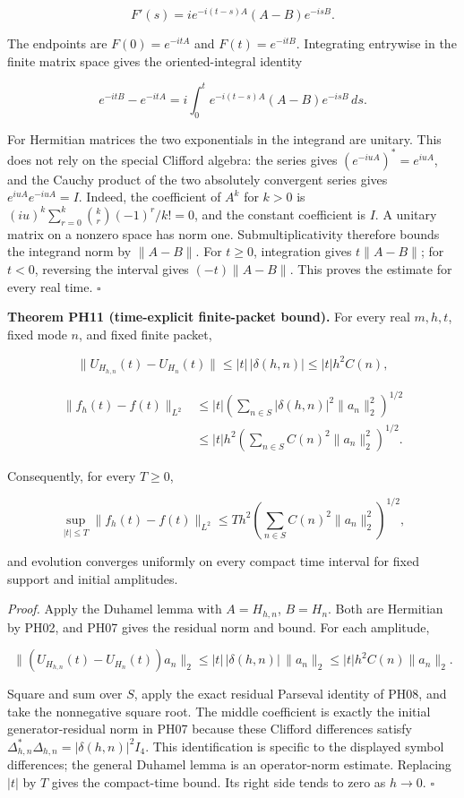 \[
F'(s)=i e^{-i(t-s)A}(A-B)e^{-isB}.
\]

The endpoints are \(F(0)=e^{-itA}\) and \(F(t)=e^{-itB}\). Integrating
entrywise in the finite matrix space gives the oriented-integral
identity

\[
e^{-itB}-e^{-itA}
=i\int_0^t e^{-i(t-s)A}(A-B)e^{-isB}\,ds.
\]

For Hermitian matrices the two exponentials in the integrand are
unitary. This does not rely on the special Clifford algebra: the series
gives \((e^{-iuA})^*=e^{iuA}\), and the Cauchy product of the two
absolutely convergent series gives \(e^{iuA}e^{-iuA}=I\). Indeed, the
coefficient of \(A^k\) for \(k>0\) is
\((iu)^k\sum_{r=0}^{k}\binom{k}{r}(-1)^r/k!=0\), and the constant
coefficient is \(I\). A unitary matrix on a nonzero space has norm one.
Submultiplicativity therefore bounds the integrand norm by \(\|A-B\|\).
For \(t\ge0\), integration gives \(t\|A-B\|\); for \(t<0\), reversing
the interval gives \((-t)\|A-B\|\). This proves the estimate for every
real time. \(\square\)

\textbf{Theorem PH11 (time-explicit finite-packet bound).} For every
real \(m,h,t\), fixed mode \(n\), and fixed finite packet,

\[
\|U_{H_{h,n}}(t)-U_{H_n}(t)\|
\le |t|\,|\delta(h,n)|\le |t|h^2C(n),
\]

\[
\begin{aligned}
\|f_h(t)-f(t)\|_{L^2}
&\le |t|\left(\sum_{n\in S}|\delta(h,n)|^2\|a_n\|_2^2\right)^{1/2}\\
&\le |t|h^2\left(\sum_{n\in S}C(n)^2\|a_n\|_2^2\right)^{1/2}.
\end{aligned}
\]

Consequently, for every \(T\ge0\),

\[
\sup_{|t|\le T}\|f_h(t)-f(t)\|_{L^2}
\le Th^2\left(\sum_{n\in S}C(n)^2\|a_n\|_2^2\right)^{1/2},
\]

and evolution converges uniformly on every compact time interval for
fixed support and initial amplitudes.

\emph{Proof.} Apply the Duhamel lemma with \(A=H_{h,n}\), \(B=H_n\).
Both are Hermitian by PH02, and PH07 gives the residual norm and bound.
For each amplitude,

\[
\|(U_{H_{h,n}}(t)-U_{H_n}(t))a_n\|_2
\le |t|\,|\delta(h,n)|\,\|a_n\|_2
\le |t|h^2C(n)\|a_n\|_2.
\]

Square and sum over \(S\), apply the exact residual Parseval identity of
PH08, and take the nonnegative square root. The middle coefficient is
exactly the initial generator-residual norm in PH07 because these
Clifford differences satisfy
\(\Delta_{h,n}^*\Delta_{h,n}=|\delta(h,n)|^2I_4\). This identification
is specific to the displayed symbol differences; the general Duhamel
lemma is an operator-norm estimate. Replacing \(|t|\) by \(T\) gives the
compact-time bound. Its right side tends to zero as \(h\to0\).
\(\square\)

